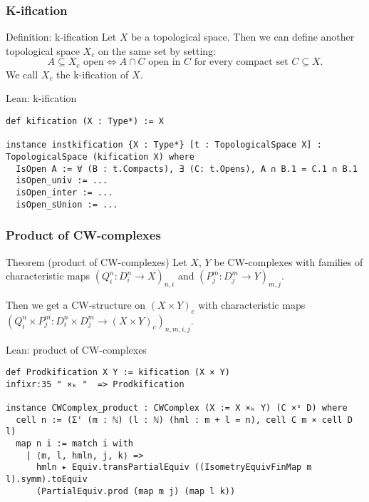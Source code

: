 \documentclass{beamer}
\begin{document}
\begin{frame}[fragile]
\frametitle{K-ification}
    \begin{block}{Definition: k-ification}
        Let $X$ be a topological space. 
        Then we can define another topological space $X_c$ on the same set by setting: 
        \[A \subseteq X_c \text{ open} \iff A \cap C \text{ open in } C \text{ for every compact set } C \subseteq X.\]
        We call $X_c$ the \alert{k-ification} of $X$.
    \end{block}
    \begin{exampleblock}{Lean: k-ification}
    \begin{lstlisting}[basicstyle=\ttfamily\footnotesize, belowskip=-0.8 \baselineskip]
def kification (X : Type*) := X

instance instkification {X : Type*} [t : TopologicalSpace X] : TopologicalSpace (kification X) where
  IsOpen A := ∀ (B : t.Compacts), ∃ (C: t.Opens), A ∩ B.1 = C.1 ∩ B.1
  isOpen_univ := ... 
  isOpen_inter := ... 
  isOpen_sUnion := ...
    \end{lstlisting}
    \end{exampleblock}
\end{frame}

\begin{frame}[fragile]
\frametitle{Product of CW-complexes}
    \begin{block}{Theorem (product of CW-complexes)}
        Let $X$, $Y$ be CW-complexes with families of characteristic maps $(Q_i^n \colon D_i^n \to X)_{n, i}$ and $(P_j^m \colon D_j^m \to Y)_{m, j}$. 

        Then we get a CW-structure on $(X \times Y)_c$ with characteristic maps $(Q_i^n \times P_j^m \colon D_i^n \times D_j^m \to (X \times Y)_c)_{n,m,i,j}$.
    \end{block}
    \begin{exampleblock}{Lean: product of CW-complexes}
    \begin{lstlisting}[basicstyle=\ttfamily\footnotesize, belowskip=-0.8 \baselineskip]
def Prodkification X Y := kification (X × Y)
infixr:35 " ×ₖ "  => Prodkification

instance CWComplex_product : CWComplex (X := X ×ₖ Y) (C ×ˢ D) where
  cell n := (Σ' (m : ℕ) (l : ℕ) (hml : m + l = n), cell C m × cell D l)
  map n i := match i with
    | ⟨m, l, hmln, j, k⟩ =>
      hmln ▸ Equiv.transPartialEquiv ((IsometryEquivFinMap m l).symm).toEquiv
      (PartialEquiv.prod (map m j) (map l k))
    \end{lstlisting}
    \end{exampleblock}
\end{frame}
\end{document}
